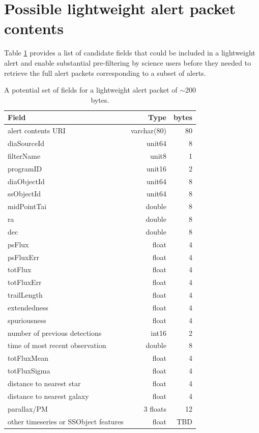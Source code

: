 \documentclass[DM,authoryear,toc]{lsstdoc}
\begin{document}


\appendix

\section{Possible lightweight alert packet contents} \label{sec:lightweight_contents}

Table \ref{tab:lightweight_alert} provides a list of candidate fields that could be included in a lightweight alert and enable substantial pre-filtering by science users before they needed to retrieve the full alert packets corresponding to a subset of alerts.

\begin{table}
  \begin{centering}
  \begin{tabular}{|l|r|r|}
    \hline
Field	& Type &	bytes \\
\hline
alert contents URI &	varchar(80)	& 80 \\
diaSourceId	&  unit64	& 8 \\
filterName &  	unit8	& 1 \\
programID	& unit16	& 2 \\
diaObjectId	& unit64 &	8 \\
ssObjectId &	unit64 &	8 \\
midPointTai &	double &	8 \\
ra &	double & 	8 \\
dec &	double & 	8 \\
psFlux &	float	& 4 \\
psFluxErr &	float	& 4 \\
totFlux	 & float &	4 \\
totFluxErr & 	float	& 4 \\
trailLength	& float	& 4 \\
extendedness & 	float & 	4 \\
spuriousness &	float	& 4 \\
number of previous detections	& int16	& 2 \\
time of most recent observation & 	double & 	8 \\
totFluxMean	& float	& 4 \\
totFluxSigma & 	float	& 4 \\
distance to nearest star & 	float	& 4 \\
distance to nearest galaxy	& float	& 4 \\
parallax/PM	& 3 floats &	12 \\
other timeseries or SSObject features & float & TBD \\
\hline
  \end{tabular}
  \caption{A potential set of fields for a lightweight alert packet of $\sim$200 bytes. \label{tab:lightweight_alert}}
\end{centering}
\end{table}
		
\end{document}
